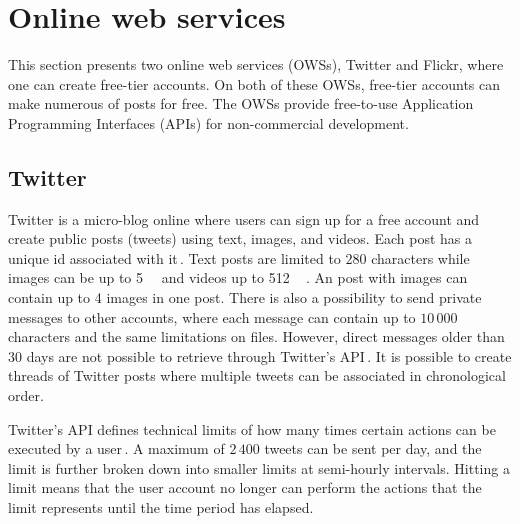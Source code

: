 \section{Online web services}
\label{sec:ows}
This section presents two online web services (OWSs), Twitter and Flickr, where one can create free-tier accounts. On both of these OWSs, free-tier accounts can make numerous of posts for free. The OWSs provide free-to-use Application Programming Interfaces (APIs) for non-commercial development. 

\subsection{Twitter}
\label{subsec:ows_twitter}
Twitter is a micro-blog online where users can sign up for a free account and create public posts (tweets) using text, images, and videos. Each post has a unique id associated with it\,\cite{twitterTwitterIDs}. Text posts are limited to $280$ characters while images can be up to \SI{5}{\mega\byte} and videos up to \SI{512}{\mega\byte}\,\cite{MediaBestPractices}. An post with images can contain up to 4 images in one post. There is also a possibility to send private messages to other accounts, where each message can contain up to $10\,000$ characters and the same limitations on files. However, direct messages older than $30$ days are not possible to retrieve through Twitter's API\,\cite{RetrievingOlder302018}. It is possible to create threads of Twitter posts where multiple tweets can be associated in chronological order.

Twitter's API defines technical limits of how many times certain actions can be executed by a user\,\cite{UnderstandingTwitterLimits}. A maximum of $2\,400$ tweets can be sent per day, and the limit is further broken down into smaller limits at semi-hourly intervals. Hitting a limit means that the user account no longer can perform the actions that the limit represents until the time period has elapsed.

